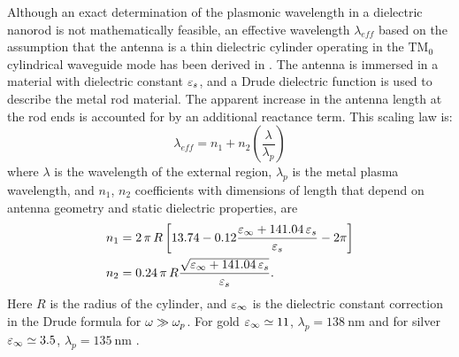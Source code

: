 \documentclass[11pt]{article}
\begin{document}
Although an exact determination of the plasmonic wavelength in a dielectric nanorod is not mathematically feasible, an effective wavelength $\lambda_{eff}$ based on the assumption that the antenna is a thin dielectric cylinder operating in the $\mathrm{TM}_0$ cylindrical waveguide mode has been derived in \cite{Novotny2007}. The antenna is immersed in a material with dielectric constant $\varepsilon_s$, and a Drude dielectric function is used to describe the metal rod material. The apparent increase in the antenna length at the rod ends is accounted for by an additional reactance term. This scaling law is:
%
\begin{equation}
  \lambda_{eff} = n_1 + n_2\left( \frac{\lambda}{\lambda_p} \right)
  \label{eq:lambda_eff}
\end{equation}
%
where $\lambda$ is the wavelength of the external region, $\lambda_p$ is the metal plasma wavelength, and $n_1$, $n_2$ coefficients with dimensions of length that depend on antenna geometry and static dielectric properties, are
%
\begin{subequations}
  \begin{align}
    n_1 ={}& 2\, \pi\, R \left[ 13.74 - 0.12 \frac{\varepsilon_\infty + 141.04\, \varepsilon_s}{\varepsilon_s} - 2\pi \right]
    \label{eq:n1}\\
    n_2 ={}& 0.24\, \pi\, R \frac{\sqrt{\varepsilon_\infty + 141.04 \, \varepsilon_s}}{\varepsilon_s}.
    \label{eq:n2}
  \end{align}
  \label{eq:ns}%
\end{subequations}
%
Here $R$ is the radius of the cylinder, and $\varepsilon_{\infty}$ is the dielectric constant correction in the Drude formula for $\omega \gg \omega_p$. For gold $\varepsilon_\infty \simeq 11$, $\lambda_p = \SI{138}{\nm}$ and for silver $\varepsilon_\infty \simeq 3.5$, $\lambda_p = \SI{135}{\nm}$ \cite{Novotny2007}.
\end{document}
